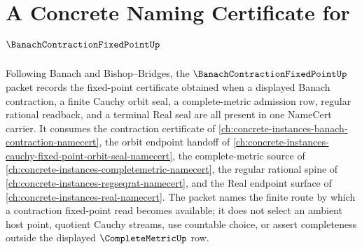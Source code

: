 \chapter{A Concrete Naming Certificate for $\BanachContractionFixedPointUp$}
\label{ch:concrete-instances-banach-contraction-fixed-point-namecert}

Following Banach and Bishop--Bridges, the $\BanachContractionFixedPointUp$ packet records the fixed-point certificate obtained when a displayed Banach contraction, a finite Cauchy orbit seal, a complete-metric admission row, regular rational readback, and a terminal Real seal are all present in one NameCert carrier. It consumes the contraction certificate of \autoref{ch:concrete-instances-banach-contraction-namecert}, the orbit endpoint handoff of \autoref{ch:concrete-instances-cauchy-fixed-point-orbit-seal-namecert}, the complete-metric source of \autoref{ch:concrete-instances-completemetric-namecert}, the regular rational spine of \autoref{ch:concrete-instances-regseqrat-namecert}, and the Real endpoint surface of \autoref{ch:concrete-instances-real-namecert}. The packet names the finite route by which a contraction fixed-point read becomes available; it does not select an ambient host point, quotient Cauchy streams, use countable choice, or assert completeness outside the displayed $\CompleteMetricUp$ row.

